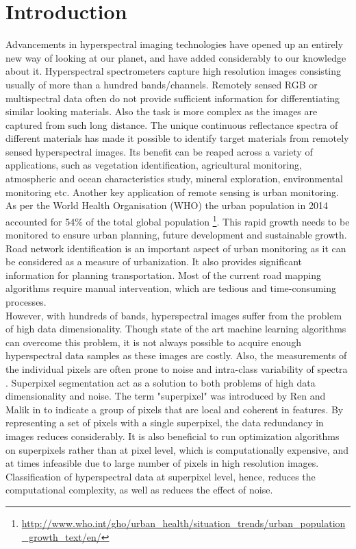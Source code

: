 \documentclass[12pt,twoside]{article}
\theoremstyle{plain}
\theoremstyle{definition}
\theoremstyle{remark}
\begin{document}
\section{Introduction}
\label{sec:introduction}
Advancements in hyperspectral imaging technologies have opened up an entirely new way of looking at our planet, and have added considerably to our knowledge about it. Hyperspectral spectrometers capture high resolution images consisting usually of more than a hundred bands/channels. Remotely sensed RGB or multispectral data often do not provide sufficient information for differentiating similar looking materials. Also the task is more complex as the images are captured from such long distance. The unique continuous reflectance spectra of different materials has made it possible to identify target materials from remotely sensed hyperspectral images. Its benefit can be reaped across a variety of applications, such as vegetation identification, agricultural monitoring, atmospheric and ocean characteristics study, mineral exploration, environmental monitoring etc. Another key application of remote sensing is urban monitoring. As per the World Health Organisation (WHO) the urban population in 2014 accounted for 54\% of  the total global population \footnote{\url{http://www.who.int/gho/urban_health/situation_trends/urban_population_growth_text/en/}}. This rapid growth needs to be monitored to ensure urban planning, future development and sustainable growth. 
Road network identification is an important aspect of urban monitoring as it can be considered as a measure of urbanization. It also provides significant information for planning transportation. Most of the current road mapping algorithms require manual intervention, which are tedious and time-consuming processes.\\
However, with hundreds of bands, hyperspectral images suffer from the problem of high data dimensionality. Though state of the art machine learning algorithms can overcome this problem, it is not always possible to acquire enough hyperspectral data samples as these images are costly. Also, the measurements of the individual pixels are often prone to noise and intra-class variability of spectra \cite{thompson2010superpixel}. Superpixel segmentation act as a solution to both problems of high data dimensionality and noise. The term "superpixel" was introduced by Ren and Malik in \cite{ren2003learning} to indicate a group of pixels that are local and coherent in features. By representing a set of pixels with a single superpixel, the data redundancy in images reduces considerably. It is also beneficial to run optimization algorithms on superpixels rather than at pixel level, which is computationally expensive, and at times infeasible due to large number of pixels in high resolution images. Classification of hyperspectral data at superpixel level, hence, reduces the computational complexity, as well as reduces the effect of noise.\\
\end{document}
